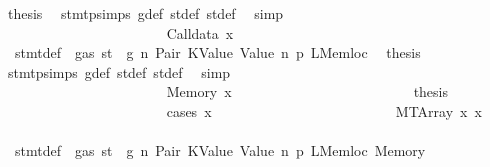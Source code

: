 \begin{isabellebody}
\ {\isacharquery}{\kern0pt}thesis\ \isamarkupfalse%
\ stmt{\isachardot}{\kern0pt}psimps{\isacharparenleft}{\kern0pt}{}{\isacharparenright}{\kern0pt}\ g{\isacharunderscore}{\kern0pt}def\ st{\isacharprime}{\kern0pt}{\isacharunderscore}{\kern0pt}def\ st{\isacharprime}{\kern0pt}{\isacharprime}{\kern0pt}{\isacharunderscore}{\kern0pt}def\ \isamarkupfalse%
\ simp\isanewline
\ \ \ \ \ \ \ \ \ \ \ \ \ \ \ \ \ \ \ \ \isamarkupfalse%
\isanewline
\ \ \ \ \ \ \ \ \ \ \ \ \ \ \ \ \ \ \ \ \ \ \isamarkupfalse%
\ {\isacharparenleft}{\kern0pt}Calldata\ x{}{\isacharparenright}{\kern0pt}\isanewline
\ \ \ \ \ \ \ \ \ \ \ \ \ \ \ \ \ \ \ \ \ \ \isamarkupfalse%
\ {}{\isacharparenleft}{\kern0pt}{}{\isacharparenright}{\kern0pt}\ stmt{\isacharunderscore}{\kern0pt}def\ {\isacharbackquoteopen}{\isasymnot}\ gas\ st\ {\isasymle}\ g{\isacharbackquoteclose}\ n\ Pair\ KValue\ Value\ n{}\ p{}\ LMemloc\ \isamarkupfalse%
\ {\isacharquery}{\kern0pt}thesis\ \isamarkupfalse%
\ stmt{\isachardot}{\kern0pt}psimps{\isacharparenleft}{\kern0pt}{}{\isacharparenright}{\kern0pt}\ g{\isacharunderscore}{\kern0pt}def\ st{\isacharprime}{\kern0pt}{\isacharunderscore}{\kern0pt}def\ st{\isacharprime}{\kern0pt}{\isacharprime}{\kern0pt}{\isacharunderscore}{\kern0pt}def\ \isamarkupfalse%
\ simp\isanewline
\ \ \ \ \ \ \ \ \ \ \ \ \ \ \ \ \ \ \ \ \isamarkupfalse%
\isanewline
\ \ \ \ \ \ \ \ \ \ \ \ \ \ \ \ \ \ \ \ \ \ \isamarkupfalse%
\ {\isacharparenleft}{\kern0pt}Memory\ x{}{\isacharparenright}{\kern0pt}\isanewline
\ \ \ \ \ \ \ \ \ \ \ \ \ \ \ \ \ \ \ \ \ \ \isamarkupfalse%
\ \isamarkupfalse%
\ {\isacharquery}{\kern0pt}thesis\isanewline
\ \ \ \ \ \ \ \ \ \ \ \ \ \ \ \ \ \ \ \ \ \ \isamarkupfalse%
\ {\isacharparenleft}{\kern0pt}cases\ x{}{\isacharparenright}{\kern0pt}\isanewline
\ \ \ \ \ \ \ \ \ \ \ \ \ \ \ \ \ \ \ \ \ \ \ \ \isamarkupfalse%
\ {\isacharparenleft}{\kern0pt}MTArray\ x{}{}\ x{}{}{\isacharparenright}{\kern0pt}\isanewline
\ \ \ \ \ \ \ \ \ \ \ \ \ \ \ \ \ \ \ \ \ \ \ \ \isamarkupfalse%
\ {}{\isacharparenleft}{\kern0pt}{}{\isacharparenright}{\kern0pt}\ stmt{\isacharunderscore}{\kern0pt}def\ {\isacharbackquoteopen}{\isasymnot}\ gas\ st\ {\isasymle}\ g{\isacharbackquoteclose}\ n\ Pair\ KValue\ Value\ n{}\ p{}\ LMemloc\ Memory\ \isamarkupfalse%

\end{isabellebody}
